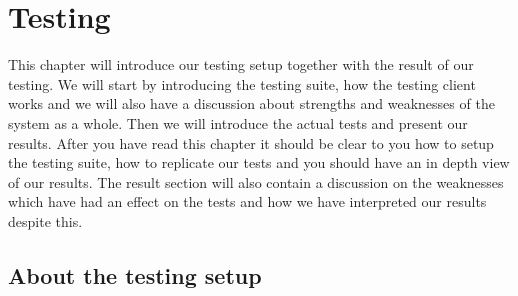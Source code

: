 \section{Testing}\label{Testing}
	This chapter will introduce our testing setup together with the result of our testing. We will start by introducing the testing suite, how the testing client works and we will also have a discussion about strengths and weaknesses of the system as a whole. Then we will introduce the actual tests and present our results. After you have read this chapter it should be clear to you how to setup the testing suite, how to replicate our tests and you should have an in depth view of our results. The result section will also contain a discussion on the weaknesses which have had an effect on the tests and how we have interpreted our results despite this.
	    
    \subsection{About the testing setup}\label{Testing:About}
    	
 		
    	
    	

	

    

